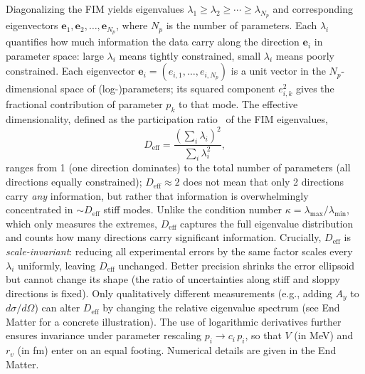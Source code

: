 \documentclass[aps,prl,reprint,superscriptaddress,showpacs]{revtex4-2}
\begin{document}
Diagonalizing the FIM yields eigenvalues $\lambda_1 \geq \lambda_2 \geq \cdots \geq \lambda_{N_p}$ and corresponding eigenvectors $\mathbf{e}_1, \mathbf{e}_2, \ldots, \mathbf{e}_{N_p}$, where $N_p$ is the number of parameters. Each $\lambda_i$ quantifies how much information the data carry along the direction $\mathbf{e}_i$ in parameter space: large $\lambda_i$ means tightly constrained, small $\lambda_i$ means poorly constrained. Each eigenvector $\mathbf{e}_i = (e_{i,1}, \ldots, e_{i,N_p})$ is a unit vector in the $N_p$-dimensional space of (log-)parameters; its squared component $e_{i,k}^2$ gives the fractional contribution of parameter $p_k$ to that mode. The effective dimensionality, defined as the participation ratio~\cite{Bell1970,Gutenkunst2007} of the FIM eigenvalues,
\begin{equation}
D_\mathrm{eff} = \frac{(\sum_i \lambda_i)^2}{\sum_i \lambda_i^2},
\end{equation}
ranges from 1 (one direction dominates) to the total number of parameters (all directions equally constrained); $D_\mathrm{eff} \approx 2$ does not mean that only 2 directions carry \emph{any} information, but rather that information is overwhelmingly concentrated in $\sim$$D_\mathrm{eff}$ stiff modes. Unlike the condition number $\kappa = \lambda_\mathrm{max}/\lambda_\mathrm{min}$, which only measures the extremes, $D_\mathrm{eff}$ captures the full eigenvalue distribution and counts how many directions carry significant information. Crucially, $D_\mathrm{eff}$ is \emph{scale-invariant}: reducing all experimental errors by the same factor scales every $\lambda_i$ uniformly, leaving $D_\mathrm{eff}$ unchanged. Better precision shrinks the error ellipsoid but cannot change its shape (the ratio of uncertainties along stiff and sloppy directions is fixed). Only qualitatively different measurements (e.g., adding $A_y$ to $d\sigma/d\Omega$) can alter $D_\mathrm{eff}$ by changing the relative eigenvalue spectrum (see End Matter for a concrete illustration). The use of logarithmic derivatives further ensures invariance under parameter rescaling $p_i \to c_i\,p_i$, so that $V$ (in MeV) and $r_v$ (in fm) enter on an equal footing. Numerical details are given in the End Matter.
\end{document}
